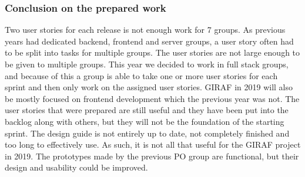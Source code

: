 \subsubsection{Conclusion on the prepared work}
Two user stories for each release is not enough work for 7 groups. 
As previous years had dedicated backend, frontend and server groups, a user story often had to be split into tasks for multiple groups.
The user stories are not large enough to be given to multiple groups.
This year we decided to work in full stack groups, and because of this a group is able to take one or more user stories for each sprint and then only work on the assigned user stories.
GIRAF in 2019 will also be mostly focused on frontend development which the previous year was not.
The user stories that were prepared are still useful and they have been put into the backlog along with others, but they will not be the foundation of the starting sprint.
The design guide is not entirely up to date, not completely finished and too long to effectively use.
As such, it is not all that useful for the GIRAF project in 2019.
The prototypes made by the previous PO group are functional, but their design and usability could be improved. 


